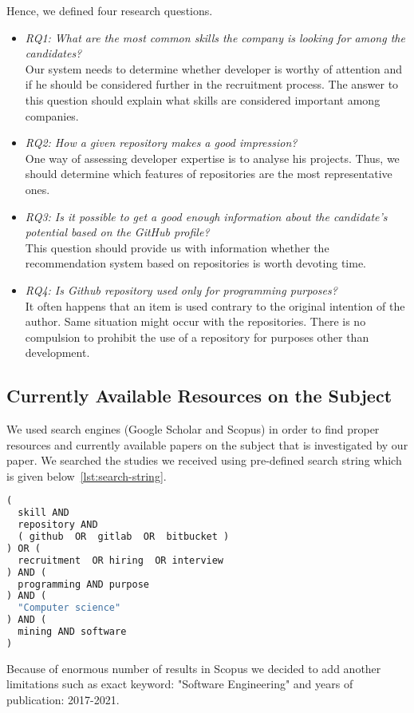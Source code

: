 Hence, we defined four research questions.
\begin{itemize}
\item{\emph{RQ1: What are the most common skills the company is looking for among the candidates?}\\
  Our system needs to determine whether developer is worthy of attention and if he should be considered further in the recruitment process. The answer to this question should explain what skills are considered important among companies. }
\item{\emph{RQ2: How a given repository makes a good impression?}\\
  One way of assessing developer expertise is to analyse his projects. Thus, we should determine which features of repositories are the most representative ones.} 
\item{\emph{RQ3: Is it possible to get a good enough information about the candidate's potential based on the GitHub profile?}\\
  This question should provide us with information whether the recommendation system based on repositories is worth devoting time.} 
\item{\emph{RQ4: Is Github repository used only for programming purposes?}\\
  It often happens that an item is used contrary to the original intention of the author. Same situation might occur with the repositories. There is no compulsion to prohibit the use of a repository for purposes other than development.}
\end{itemize}

\subsection{Currently Available Resources on the Subject}
We used search engines (Google Scholar and Scopus) in order to find proper resources and currently available papers on the subject that is investigated by our paper. We searched the studies we received using pre-defined search string which is given below~\ref{lst:search-string}.

\begin{lstlisting}[language=Python, label={lst:search-string}]
(
  skill AND
  repository AND
  ( github  OR  gitlab  OR  bitbucket )
) OR (
  recruitment  OR hiring  OR interview
) AND (
  programming AND purpose
) AND (
  "Computer science"
) AND (
  mining AND software
)
\end{lstlisting}
Because of enormous number of results in Scopus we decided to add another limitations such as exact keyword: "Software Engineering" and years of publication: 2017-2021.


